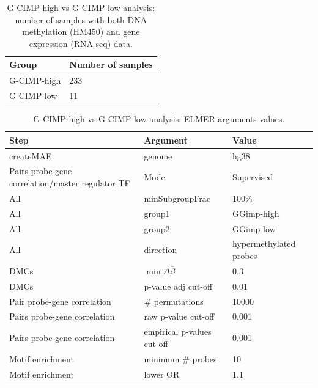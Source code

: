 \begin{table}[h!]
\centering
\caption[G-CIMP analysis: Sample summary]{G-CIMP-high vs G-CIMP-low analysis: number of samples with both DNA methylation (HM450) and gene expression (RNA-seq) data.}
\label{gcimp.samples}
\begin{tabular}{@{}ll@{}}
\toprule
Group       & Number of samples \\ \midrule
G-CIMP-high & 233               \\
G-CIMP-low  & 11
\end{tabular}
\end{table}
\begin{table}[h!]
\centering
\caption[G-CIMP analysis: ELMER arguments values]{G-CIMP-high vs G-CIMP-low analysis: ELMER arguments values.}
\label{gcip.elmer.arg}
\begin{tabular}{@{}lll@{}}
\toprule
Step                        & Argument                           & Value  \\ \midrule
createMAE           & genome &  hg38   \\
Pairs probe-gene correlation/master regulator TF             & Mode &  Supervised   \\
All                         & minSubgroupFrac                    & 100\%  \\
All                         & group1                    & GGimp-high  \\
All                         & group2                    & GGimp-low  \\
All                         & direction                    & hypermethylated probes  \\
DMCs & $\min\Delta\overline{\beta}$                & 0.3    \\
DMCs & p-value adj cut-off                & 0.01   \\
Pair probe-gene correlation           & \# permutations                    & 10000  \\
Pairs  probe-gene correlation           & raw p-value cut-off                & 0.001 \\
Pairs  probe-gene correlation           & empirical p-values cut-off         & 0.001 \\
Motif enrichment            & minimum \# probes  & 10     \\
Motif enrichment            & lower OR                           & 1.1    \\ \bottomrule
\end{tabular}
\end{table}


